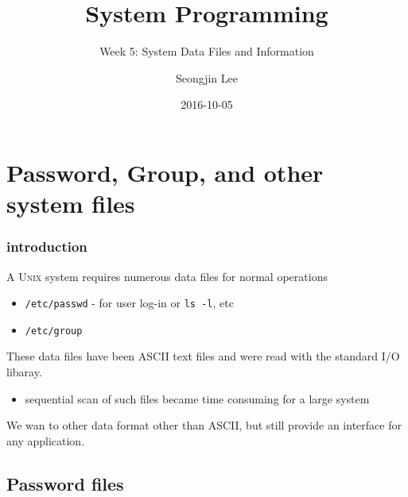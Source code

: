 \documentclass[newPxFont,sthlmFooter,nooffset]{beamer}
\title{System Programming}
\subtitle{Week 5: System Data Files and Information}
\author[SJL]{Seongjin Lee}
\institute{\href{mailto:insight@hanyang.ac.kr}{insight@hanyang.ac.kr}\\\url{http://esos.hanyang.ac.kr}\\Esos Lab. Hanyang University}
\date{2016-10-05}
\begin{document}
\frame[plain]{\titlepage} 




\section{Password, Group, and other system files}

\begin{frame}[t]
  \frametitle{introduction}
A \textsc{Unix} system requires numerous data files for normal operations
\begin{itemize}
\item \texttt{/etc/passwd} - for user log-in or \texttt{ls -l}, etc
\item \texttt{/etc/group} 
\end{itemize}

These data files have been ASCII text files and were read with the standard I/O libaray.

\begin{itemize}
\item sequential scan of such files became time consuming for a large system
\end{itemize}


We wan to other data format other than ASCII, but still provide an interface for any application.

\end{frame}




\subsection{Password files}
\end{document}
